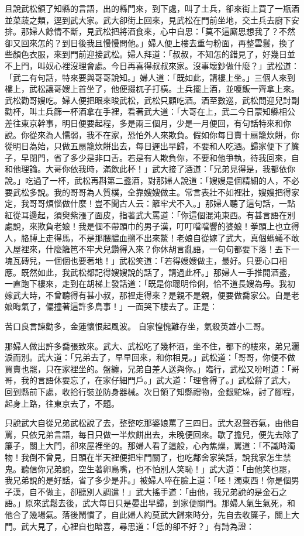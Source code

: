 且說武松領了知縣的言語，出的縣門來，到下處，叫了土兵，卻來街上買了一瓶酒並菜蔬之類，逕到武大家。武大卻街上回來，見武松在門前坐地，交土兵去廚下安排。那婦人餘情不斷，見武松把將酒食來，心中自思：「莫不這廝思想我了？不然卻又回來怎的？到日後我且慢慢問他。」婦人便上樓去重勻粉面，再整雲鬟，換了些顏色衣服，來到門前迎接武松。婦人拜道：「叔叔，不知怎的錯見了，好幾日並不上門，叫奴心裡沒理會處。今日再喜得叔叔來家。沒事壞鈔做什麼？」武松道： 「武二有句話，特來要與哥哥說知。」婦人道：「既如此，請樓上坐。」三個人來到樓上，武松讓哥嫂上首坐了，他便掇杌子打橫。土兵擺上酒，並嗄飯一齊拿上來。武松勸哥嫂吃。婦人便把眼來睃武松，武松只顧吃酒。酒至數巡，武松問迎兒討副勸杯，叫土兵篩一杯酒拿在手裡，看著武大道：「大哥在上，武二今日蒙知縣相公差往東京幹事，明日便要起程，多是兩三個月，少是一月便回，有句話特來和你說。你從來為人懦弱，我不在家，恐怕外人來欺負。假如你每日賣十扇籠炊餅，你從明日為始，只做五扇籠炊餅出去，每日遲出早歸，不要和人吃酒。歸家便下了簾子，早閉門，省了多少是非口舌。若是有人欺負你，不要和他爭執，待我回來，自和他理論。大哥你依我時，滿飲此杯！」武大接了酒道：「兄弟見得是，我都依你說。」吃過了一杯，武松再斟第二盞酒，對那婦人說道：「嫂嫂是個精細的人，不必要武松多說。我的哥哥為人質樸，全靠嫂嫂做主。常言表壯不如裡壯，嫂嫂把得家定，我哥哥煩惱做什麼！豈不聞古人云：籬牢犬不入。」那婦人聽了這句話，一點紅從耳邊起，須臾紫漲了面皮，指著武大罵道：「你這個混沌東西。有甚言語在別處說，來欺負老娘！我是個不帶頭巾的男子漢，叮叮噹噹響的婆娘！拳頭上也立得人，胳膊上走得馬，不是那腲膿血搠不出來鱉！老娘自從嫁了武大，真個螞蟻不敢入屋裡來，什麼籬笆不牢犬兒鑽得入來？你休胡言亂語，一句句都要下落！丟下一塊瓦磚兒，一個個也要著地！」武松笑道：「若得嫂嫂做主，最好。只要心口相應。既然如此，我武松都記得嫂嫂說的話了，請過此杯。」那婦人一手推開酒盞，一直跑下樓來，走到在胡梯上發話道：「既是你聰明伶俐，恰不道長嫂為母。我初嫁武大時，不曾聽得有甚小叔，那裡走得來？是親不是親，便要做喬家公。自是老娘晦氣了，偏撞著這許多鳥事！」一面哭下樓去了。正是：

苦口良言諫勸多，金蓮懷恨起風波。
自家惶愧難存坐，氣殺英雄小二哥。

那婦人做出許多喬張致來。武大、武松吃了幾杯酒，坐不住，都下的樓來，弟兄灑淚而別。武大道：「兄弟去了，早早回來，和你相見。」武松道：「哥哥，你便不做買賣也罷，只在家裡坐的。盤纏，兄弟自差人送與你。」臨行，武松又吩咐道：「哥哥，我的言語休要忘了，在家仔細門戶。」武大道：「理會得了。」武松辭了武大，回到縣前下處，收拾行裝並防身器械。次日領了知縣禮物，金銀駝垛，討了腳程，起身上路，往東京去了，不題。

只說武大自從兄弟武松說了去，整整吃那婆娘罵了三四日。武大忍聲吞氣，由他自罵，只依兄弟言語，每日只做一半炊餅出去，未晚便回來。歇了擔兒，便先去除了簾子，關上大門，卻來屋裡坐的。那婦人看了這般，心內焦燥，罵道：「不識時濁物！我倒不曾見，日頭在半天裡便把牢門關了，也吃鄰舍家笑話，說我家怎生禁鬼。聽信你兄弟說，空生著卵鳥嘴，也不怕別人笑恥！」武大道：「由他笑也罷，我兄弟說的是好話，省了多少是非。」被婦人啐在臉上道：「呸！濁東西！你是個男子漢，自不做主，卻聽別人調遣！」武大搖手道：「由他，我兄弟說的是金石之語。」原來武鬆去後，武大每日只是晏出早歸，到家便關門。那婦人氣生氣死，和他合了幾場氣。落後鬧慣了，自此婦人約莫武大歸來時分，先自去收簾子，關上大門。武大見了，心裡自也暗喜，尋思道：「恁的卻不好？」有詩為證：

